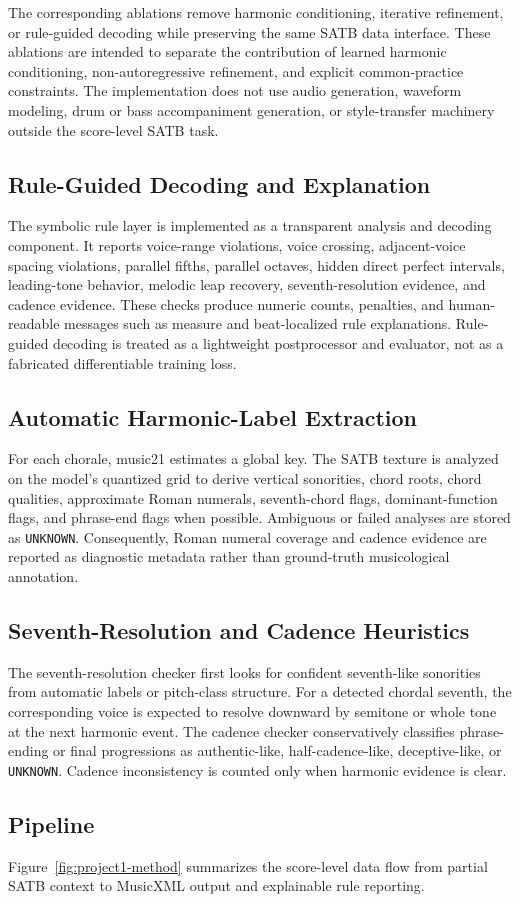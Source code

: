 The corresponding ablations remove harmonic conditioning, iterative refinement, or rule-guided decoding while preserving the same SATB data interface. These ablations are intended to separate the contribution of learned harmonic conditioning, non-autoregressive refinement, and explicit common-practice constraints. The implementation does not use audio generation, waveform modeling, drum or bass accompaniment generation, or style-transfer machinery outside the score-level SATB task.

\subsection{Rule-Guided Decoding and Explanation}

The symbolic rule layer is implemented as a transparent analysis and decoding component. It reports voice-range violations, voice crossing, adjacent-voice spacing violations, parallel fifths, parallel octaves, hidden direct perfect intervals, leading-tone behavior, melodic leap recovery, seventh-resolution evidence, and cadence evidence. These checks produce numeric counts, penalties, and human-readable messages such as measure and beat-localized rule explanations. Rule-guided decoding is treated as a lightweight postprocessor and evaluator, not as a fabricated differentiable training loss.

\subsection{Automatic Harmonic-Label Extraction}

For each chorale, music21 estimates a global key. The SATB texture is analyzed on the model's quantized grid to derive vertical sonorities, chord roots, chord qualities, approximate Roman numerals, seventh-chord flags, dominant-function flags, and phrase-end flags when possible. Ambiguous or failed analyses are stored as \texttt{UNKNOWN}. Consequently, Roman numeral coverage and cadence evidence are reported as diagnostic metadata rather than ground-truth musicological annotation.

\subsection{Seventh-Resolution and Cadence Heuristics}

The seventh-resolution checker first looks for confident seventh-like sonorities from automatic labels or pitch-class structure. For a detected chordal seventh, the corresponding voice is expected to resolve downward by semitone or whole tone at the next harmonic event. The cadence checker conservatively classifies phrase-ending or final progressions as authentic-like, half-cadence-like, deceptive-like, or \texttt{UNKNOWN}. Cadence inconsistency is counted only when harmonic evidence is clear.

\subsection{Pipeline}

Figure~\ref{fig:project1-method} summarizes the score-level data flow from partial SATB context to MusicXML output and explainable rule reporting.


